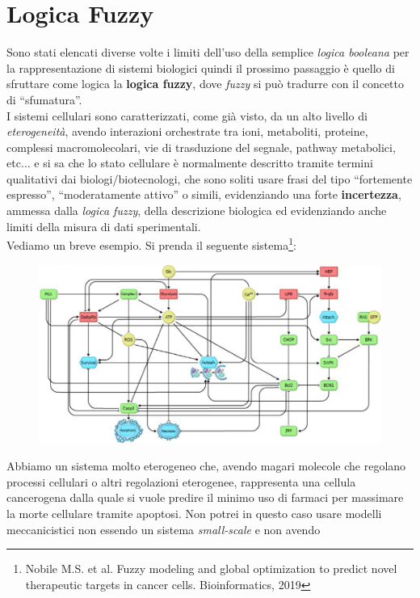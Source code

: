 \documentclass[a4paper,12pt, oneside]{book}
\begin{document}
\section{Logica Fuzzy}
Sono stati elencati diverse volte i limiti dell'uso della semplice
\textit{logica booleana} per la rappresentazione di sistemi biologici quindi il
prossimo passaggio è quello di sfruttare come logica la \textbf{logica fuzzy},
dove \textit{fuzzy} si può tradurre con il concetto di ``sfumatura''.\\
I sistemi cellulari sono caratterizzati, come già visto, da un alto livello di
\textit{eterogeneità}, avendo interazioni orchestrate tra ioni, metaboliti,
proteine, complessi macromolecolari, vie di trasduzione del segnale, pathway
metabolici, etc$\ldots$ e si sa che lo stato cellulare è normalmente descritto
tramite termini qualitativi dai biologi/biotecnologi, che sono soliti usare
frasi del tipo ``fortemente espresso'', ``moderatamente attivo'' o simili,
evidenziando una forte \textbf{incertezza}, ammessa dalla \textit{logica fuzzy},
della descrizione biologica ed evidenziando anche limiti della misura di dati
sperimentali. \\
Vediamo un breve esempio. Si prenda il seguente sistema\footnote{Nobile M.S. et
  al. Fuzzy modeling and global optimization to predict novel therapeutic
  targets in cancer cells. Bioinformatics, 2019}: 
\begin{figure}[H]
  \centering
  \includegraphics[scale = 1.60]{img/fuz1.jpg}
\end{figure}
Abbiamo un sistema molto eterogeneo che, avendo magari molecole che regolano
processi cellulari o altri regolazioni eterogenee, rappresenta una cellula
cancerogena dalla quale si vuole predire il minimo uso di farmaci per massimare
la morte cellulare tramite apoptosi. Non potrei in questo caso usare modelli
meccanicistici non essendo un sistema \textit{small-scale} e non avendo
\end{document}
